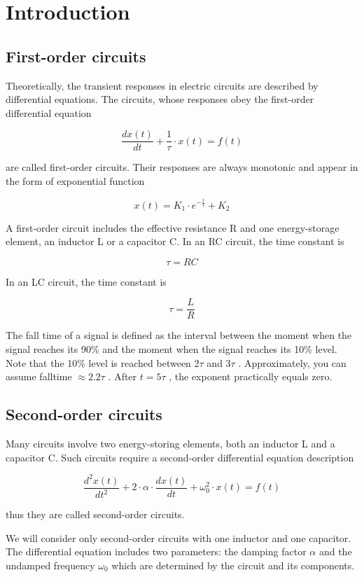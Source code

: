 \documentclass{article}
\begin{document}
\section{Introduction}

\subsection{First-order circuits}

Theoretically, the transient responses in electric circuits are described by differential equations. The circuits, whose responses obey the first-order differential equation

$$\frac{dx(t)}{dt}+\frac{1}{\tau}\cdot x(t)=f(t)$$

are called first-order circuits. Their responses are always monotonic and appear in the form of exponential function

$$x(t)=K_1\cdot e^{-\frac{t}{\tau}}+K_2$$

A first-order circuit includes the effective resistance R and one energy-storage element, an inductor L or a capacitor C.
In an RC circuit, the time constant is

$$\tau=RC$$

In an LC circuit, the time constant is

$$\tau=\frac{L}{R}$$

The fall time of a signal is defined as the interval between the moment when the signal reaches its 90\% and the moment when the signal reaches its 10\% level. Note that the 10\% level is reached between 2$\tau$ and 3$\tau$ . Approximately, you can assume falltime $\approx2.2\tau$ . After $t = 5\tau$ , the exponent practically equals zero.



\subsection{Second-order circuits}

Many circuits involve two energy-storing elements, both an inductor L and a capacitor C. Such circuits require a second-order differential equation description

$$\frac{d^2x(t)}{dt^2}+2\cdot\alpha\cdot\frac{dx(t)}{dt}+\omega_0^2\cdot x(t)=f(t)$$

thus they are called second-order circuits.

We will consider only second-order circuits with one inductor and one capacitor. The differential equation includes two parameters: the damping factor $\alpha$ and the undamped frequency $\omega_0$ which are determined by the circuit and its components.
\end{document}
